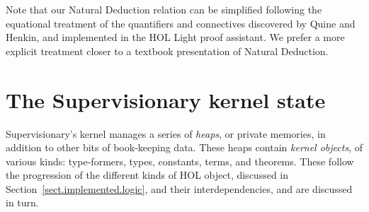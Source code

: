 \documentclass[a4paper, UKenglish, cleveref, autoref, thm-restate, colorlinks]{lipics-v2021}
\begin{document}
Note that our Natural Deduction relation can be simplified following the equational treatment of the quantifiers and connectives discovered by Quine and Henkin, and implemented in the HOL Light proof assistant.
We prefer a more explicit treatment closer to a textbook presentation of Natural Deduction.

\section{The Supervisionary kernel state}
\label{sect.the.kernel.state}

Supervisionary's kernel manages a series of \emph{heaps}, or private memories, in addition to other bits of book-keeping data.
These heaps contain \emph{kernel objects}, of various kinds: type-formers, types, constants, terms, and theorems.
These follow the progression of the different kinds of HOL object, discussed in Section~\ref{sect.implemented.logic}, and their interdependencies, and are discussed in turn.
\end{document}
